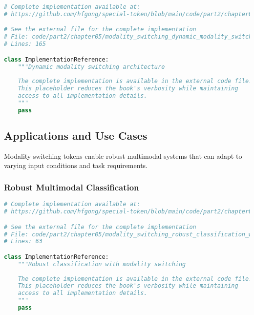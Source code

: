 \begin{lstlisting}[language=Python, caption={Dynamic modality switching architecture}]
# Complete implementation available at:
# https://github.com/hfgong/special-token/blob/main/code/part2/chapter05/modality_switching_dynamic_modality_switching_arc.py

# See the external file for the complete implementation
# File: code/part2/chapter05/modality_switching_dynamic_modality_switching_arc.py
# Lines: 165

class ImplementationReference:
    """Dynamic modality switching architecture
    
    The complete implementation is available in the external code file.
    This placeholder reduces the book's verbosity while maintaining
    access to all implementation details.
    """
    pass
\end{lstlisting}

\subsection{Applications and Use Cases}

Modality switching tokens enable robust multimodal systems that can adapt to varying input conditions and task requirements.

\subsubsection{Robust Multimodal Classification}

\begin{lstlisting}[language=Python, caption={Robust classification with modality switching}]
# Complete implementation available at:
# https://github.com/hfgong/special-token/blob/main/code/part2/chapter05/modality_switching_robust_classification_with_mod.py

# See the external file for the complete implementation
# File: code/part2/chapter05/modality_switching_robust_classification_with_mod.py
# Lines: 63

class ImplementationReference:
    """Robust classification with modality switching
    
    The complete implementation is available in the external code file.
    This placeholder reduces the book's verbosity while maintaining
    access to all implementation details.
    """
    pass
\end{lstlisting}

